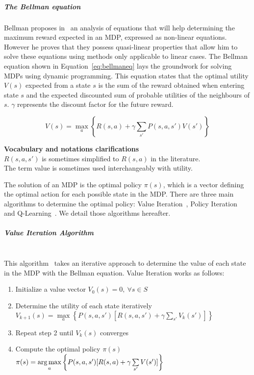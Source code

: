 \subparagraph{The Bellman equation}
Bellman proposes in~\cite{bellman1957} an analysis of equations that will help determining the maximum reward expected in an MDP, expressed as non-linear equations. However he proves that they possess quasi-linear properties that allow him to solve these equations using methods only applicable to linear cases. 
The Bellman equation shown in Equation~\eqref{eq:bellmaneq} lays the groundwork for solving MDPs using dynamic programming.
This equation states that the optimal utility $V(s)$ expected from a state $s$ is the sum of the reward obtained when entering state $s$ and the expected discounted sum of probable utilities of the neighbours of $s$. $\gamma$ represents the discount factor for the future reward.

\begin{equation}
V(s) = \max\limits_a \left \{R(s,a) + \gamma   \sum\limits_{s'} P(s,a,s')V(s') \right \}
\label{eq:bellmaneq}
\end{equation}



\textbf{Vocabulary and notations clarifications}\\
$R(s,a,s')$ is sometimes simplified to $R(s,a)$ in the literature.\\
The term value is sometimes used interchangeably with utility.




The solution of an MDP is the optimal policy $\pi(s)$, which is a vector defining the optimal action for each possible state in the MDP.
There are three main algorithms to determine the optimal policy: Value Iteration~\cite{bellman1957}, Policy Iteration~\cite{policyiteration} and Q-Learning~\cite{qlearning}.
We detail those algorithms hereafter.


\subparagraph{Value Iteration Algorithm}\textbf{\\}
This algorithm~\cite{bellman1957} takes an iterative approach to determine the value of each state in the MDP with the Bellman equation.
Value Iteration works as follows:
\begin{enumerate}
    \item Initialize a value vector $V_0(s)=0,~\forall s\in S$
    \item Determine the utility of each state iteratively\\{$V_{k+1}(s) = \max\limits_a \left \{ P(s,a,s')[R(s,a,s') + \gamma \sum\limits_{s'}V_k(s')] \right \}$}
    \item Repeat step 2 until $V_{k}(s)$ converges
    \item Compute the optimal policy $\pi(s)$\\$\pi(s) = \operatorname*{arg\,max}\limits_a \left \{P(s,a,s')[R(s,a) + \gamma \sum\limits_{s'}V(s')] \right \}$
\end{enumerate}

